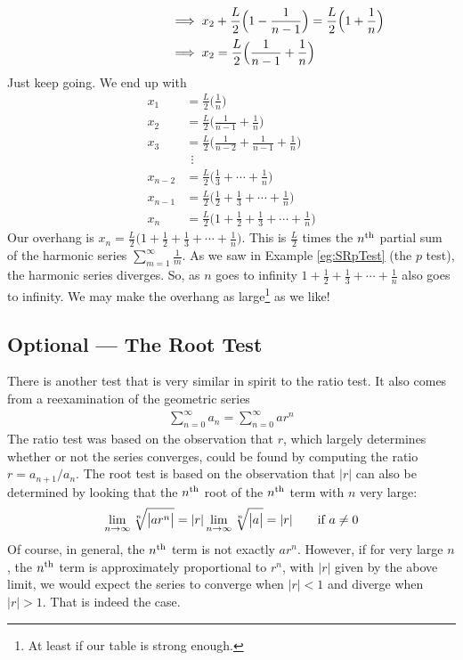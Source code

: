 \begin{itemize}
\begin{align*}
&\hskip1in\implies x_2 + \frac{L}{2}\Big(1-\frac{1}{n-1}\Big)
    =\frac{L}{2}\Big(1+\frac{1}{n}\Big) \\
&\hskip1in\implies x_2 = \frac{L}{2}\Big(\frac{1}{n-1}+\frac{1}{n}\Big)
\end{align*}
Just keep going. We end up with
\begin{align*}
x_1 &= \frac{L}{2}\Big(\frac{1}{n}\Big)  \\
x_2 &= \frac{L}{2}\Big(\frac{1}{n-1}+\frac{1}{n}\Big) \\
x_3 &= \frac{L}{2}\Big(\frac{1}{n-2}+\frac{1}{n-1}+\frac{1}{n}\Big) \\
    &\ \  \vdots \\
x_{n-2} &= \frac{L}{2}\Big(\frac{1}{3}+\cdots+\frac{1}{n}\Big) \\
x_{n-1} &= \frac{L}{2}\Big(\frac{1}{2}+\frac{1}{3}+\cdots+\frac{1}{n}\Big) \\
x_n &= \frac{L}{2}\Big(1+\frac{1}{2}+\frac{1}{3}+\cdots+\frac{1}{n}\Big)
\end{align*}
Our overhang is $x_n = \frac{L}{2}\big(1+\frac{1}{2}+\frac{1}{3}+\cdots+\frac{1}{n}\big)$.
This is $\frac{L}{2}$ times the $n^{\rm th}$ partial sum of the
harmonic series $\sum_{m=1}^\infty\frac{1}{m}$. As we saw in Example
\ref{eg:SRpTest} (the $p$ test), the harmonic series diverges.
So, as $n$ goes to infinity $1+\frac{1}{2}+\frac{1}{3}+\cdots+\frac{1}{n}$
also goes to infinity.
We may make the overhang as large\footnote{At least if our table is strong enough.} as we like!

\end{itemize}

\subsection{Optional --- The Root Test}\label{sec:RootTest}

There is another test that is very similar in spirit to the
ratio test. It also comes from a reexamination of the
geometric series
\begin{align*}
  \sum_{n=0}^\infty a_n = \sum_{n=0}^\infty a r^n
\end{align*}
The ratio test was based on the observation that $r$, which largely
determines whether or not the series converges, could be found by
computing the ratio $r = a_{n+1}/a_n$. The root test is based on
the observation that $|r|$ can also be determined by looking that
the $n^{\rm th}$ root of the $n^{\rm th}$ term with $n$ very large:
\begin{equation*}
\lim_{n\to\infty}\root{n}\of{\big|ar^n\big|}
=|r|\lim_{n\to\infty}\root{n}\of{\big|a\big|}
=|r|\qquad\text{if $a\ne 0$}
\end{equation*}
Of course, in general, the $n^{\rm th}$ term is not exactly $ar^n$.
However, if for very large $n$, the $n^{\rm th}$ term is
approximately proportional to $r^n$, with $|r|$ given by the above limit,
we would expect the series to converge when $|r|<1$ and diverge when $|r|>1$.
That is indeed the case.

